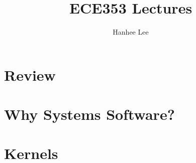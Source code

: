 \documentclass[twoside]{article}
\title{ECE353 Lectures}
\author{Hanhee Lee}
\begin{document}
\maketitle

\tableofcontents

\begin{definition}
    
\end{definition}

\begin{process}

\end{process}

\begin{motivation}

\end{motivation}

\begin{derivation}

\end{derivation}

\begin{warning}

\end{warning}

\begin{summary}

\end{summary}

\begin{algo}

\end{algo}

\begin{example}
    
\end{example}

\begin{faq}

\end{faq}
\cleardoublepage

\section{Review}

\cleardoublepage

\section{Why Systems Software?}

\cleardoublepage

\section{Kernels} 

\cleardoublepage
\end{document}
